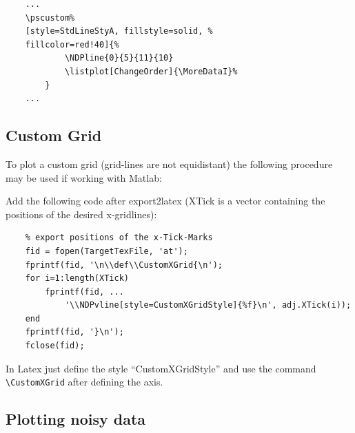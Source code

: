 \begin{minipage}{0.5\linewidth}
\begin{verbatim}
	...
	\pscustom%
	[style=StdLineStyA, fillstyle=solid, %
	fillcolor=red!40]{%
			\NDPline{0}{5}{11}{10}
			\listplot[ChangeOrder]{\MoreDataI}%
		}
	...
\end{verbatim}
\end{minipage}
\begin{minipage}{0.45\linewidth}
\centering
	\begin{NumericDataPlot}{\textwidth}{5cm}
		
		\plotyAxis[NoLabel]{}
		
		\listplot[style=StdLineStyB]{\MoreDataI}
	\end{NumericDataPlot}
\end{minipage}


\subsection{Custom Grid}

To plot a custom grid (grid-lines are not equidistant) the following procedure
may be used if working with Matlab:

Add the following code after export2latex (XTick is a vector containing the
positions of the desired x-gridlines):
\begin{verbatim}
    % export positions of the x-Tick-Marks
    fid = fopen(TargetTexFile, 'at');
    fprintf(fid, '\n\\def\\CustomXGrid{\n');
    for i=1:length(XTick)
        fprintf(fid, ...
        	'\\NDPvline[style=CustomXGridStyle]{%f}\n', adj.XTick(i));
    end
    fprintf(fid, '}\n');
    fclose(fid);
\end{verbatim}

In Latex just define the style ``CustomXGridStyle'' and use the command
\verb+\CustomXGrid+ after defining the axis.


\subsection{Plotting noisy data}
\label{sec:FurtherExamples:NoisyData}

